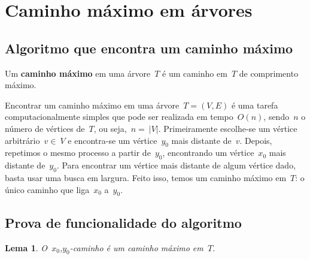 \documentclass[a4paper,12pt]{article}
\newtheorem{lem}{Lema}
\begin{document}
\section{Caminho máximo em árvores}
\label{sec:caminhoMaximo}
	\subsection{Algoritmo que encontra um caminho máximo}

	Um \textbf{caminho máximo} em uma árvore~$T$ é um caminho 
	em~$T$ de comprimento máximo.

	Encontrar um caminho máximo em uma árvore~$T=(V,E)$ é uma 
	tarefa computacionalmente simples que pode ser realizada em 
	tempo~$O(n)$, sendo~$n$ o número de vértices de~$T$, ou 
	seja,~$n =~|V|$. 
	Primeiramente escolhe-se um vértice arbitrário~$v \in~V$ e 
	encontra-se um vértice~$y_0$ mais distante de~$v$.
	Depois, repetimos o mesmo processo a partir de~$y_0$, 
	encontrando um vértice~$x_0$ mais distante de~$y_0$. 
	Para encontrar um vértice mais distante de algum vértice dado, 
	basta usar uma busca em largura.  
	Feito isso, temos um caminho máximo em~$T$: o único caminho
	que liga~$x_0$ a~$y_0$.

	\bigskip

	\subsection{Prova de funcionalidade do algoritmo}

	\begin{lem}
	\label{lema:caminhoMax}
		O~$x_0$,$y_0$-caminho é um caminho máximo em~$T$.
	\end{lem}

	\bigskip
\end{document}

